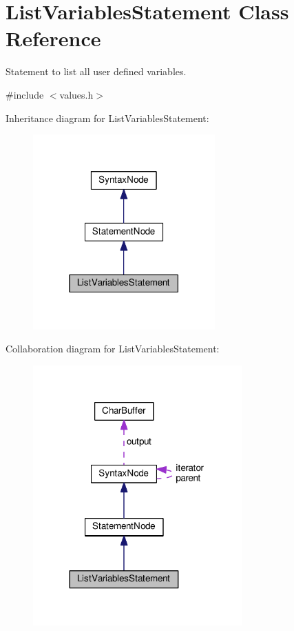\hypertarget{classListVariablesStatement}{}\section{List\+Variables\+Statement Class Reference}
\label{classListVariablesStatement}


Statement to list all user defined variables.  




{\ttfamily \#include $<$values.\+h$>$}



Inheritance diagram for List\+Variables\+Statement\+:
\nopagebreak
\begin{figure}[H]
\begin{center}
\leavevmode
\includegraphics[width=198pt]{d0/d4a/classListVariablesStatement__inherit__graph}
\end{center}
\end{figure}


Collaboration diagram for List\+Variables\+Statement\+:
\nopagebreak
\begin{figure}[H]
\begin{center}
\leavevmode
\includegraphics[width=227pt]{d7/d01/classListVariablesStatement__coll__graph}
\end{center}
\end{figure}

